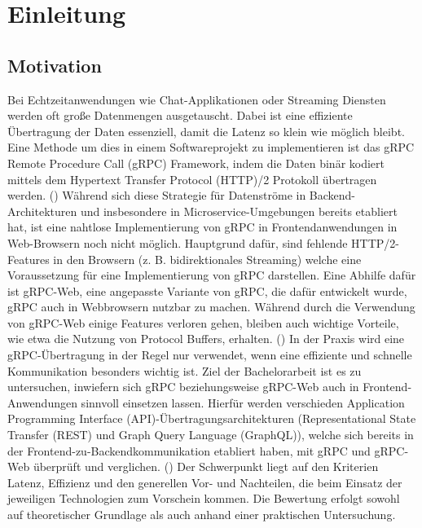 \chapter{ Einleitung }
\label{chap:info_REMOVE_ME}
\chapterstart

\section{Motivation}
Bei Echtzeitanwendungen wie Chat-Applikationen oder Streaming Diensten werden oft große Datenmengen ausgetauscht. Dabei ist eine effiziente Übertragung der Daten essenziell, damit die Latenz so klein wie möglich bleibt. Eine Methode um dies in einem Softwareprojekt zu implementieren ist das gRPC Remote Procedure Call (gRPC) Framework, indem die Daten binär kodiert mittels dem Hypertext Transfer Protocol (HTTP)/2 Protokoll übertragen werden. (\parencite{gRPCAbout})
Während sich diese Strategie für Datenströme in Backend-Architekturen und insbesondere in Microservice-Umgebungen bereits etabliert hat, ist eine nahtlose Implementierung von gRPC in Frontendanwendungen in Web-Browsern noch nicht möglich. Hauptgrund dafür, sind fehlende HTTP/2-Features in den Browsern (z. B. bidirektionales Streaming) welche eine Voraussetzung für eine Implementierung von gRPC darstellen. Eine Abhilfe dafür ist gRPC-Web, eine angepasste Variante von gRPC, die dafür entwickelt wurde, gRPC auch in Webbrowsern nutzbar zu machen. Während durch die Verwendung von gRPC-Web einige Features verloren gehen, bleiben auch wichtige Vorteile, wie etwa die Nutzung von Protocol Buffers, erhalten. (\parencite{Brandhorst2019}) In der Praxis wird eine gRPC-Übertragung in der Regel nur verwendet, wenn eine effiziente und schnelle Kommunikation besonders wichtig ist. Ziel der Bachelorarbeit ist es zu untersuchen, inwiefern sich gRPC beziehungsweise gRPC-Web auch in Frontend-Anwendungen sinnvoll einsetzen lassen. Hierfür werden verschieden Application Programming Interface (API)-Übertragungsarchitekturen (Representational State Transfer (REST) und Graph Query Language (GraphQL)), welche sich bereits in der Frontend-zu-Backendkommunikation etabliert haben, mit gRPC und gRPC-Web überprüft und verglichen. (\parencite{Ahmad2025}) Der Schwerpunkt liegt auf den Kriterien Latenz, Effizienz und den generellen Vor- und Nachteilen, die beim Einsatz der jeweiligen Technologien zum Vorschein kommen. Die Bewertung erfolgt sowohl auf theoretischer Grundlage als auch anhand einer praktischen Untersuchung.

